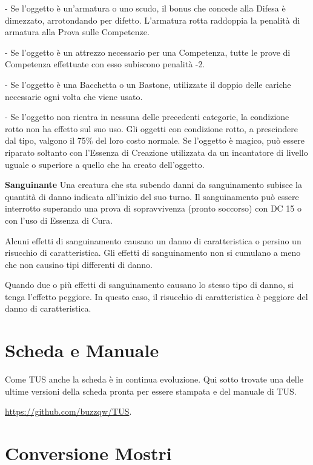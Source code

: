 \documentclass[a4paper,11pt,twoside,openany]{book}
\begin{document}
- Se l'oggetto è un'armatura o uno scudo, il bonus che concede alla Difesa è dimezzato, arrotondando per difetto. L'armatura rotta raddoppia la penalità di armatura alla Prova sulle Competenze.

- Se l'oggetto è un attrezzo necessario per una Competenza, tutte le prove di Competenza effettuate con esso subiscono penalità -2.

- Se l'oggetto è una Bacchetta o un Bastone, utilizzate il doppio delle cariche necessarie ogni volta che viene usato.

- Se l'oggetto non rientra in nessuna delle precedenti categorie, la condizione rotto non ha effetto sul suo uso. Gli oggetti con condizione rotto, a prescindere dal tipo, valgono il 75\% del loro costo normale. Se l'oggetto è magico, può essere riparato soltanto con l'Essenza di Creazione utilizzata da un incantatore di livello uguale o superiore a quello che ha creato dell'oggetto.

\textbf{Sanguinante} Una creatura che sta subendo danni da sanguinamento subisce la quantità di danno indicata all'inizio del suo turno. Il sanguinamento può essere interrotto superando una prova di sopravvivenza (pronto soccorso) con DC 15 o con l'uso di Essenza di Cura.

Alcuni effetti di sanguinamento causano un danno di caratteristica o persino un risucchio di caratteristica. Gli effetti di sanguinamento non si cumulano a meno che non causino tipi differenti di danno.

Quando due o più effetti di sanguinamento causano lo stesso tipo di danno, si tenga l'effetto peggiore. In questo caso, il risucchio di caratteristica è peggiore del danno di caratteristica.

\pagebreak

\section{Scheda e Manuale}

\label{scheda-e-manuale}

Come TUS anche la scheda è in continua evoluzione. Qui sotto trovate una delle ultime versioni della scheda pronta per essere stampata e del manuale di TUS.

\url{https://github.com/buzzqw/TUS}.





\pagebreak

\section*{Conversione Mostri}
\end{document}

